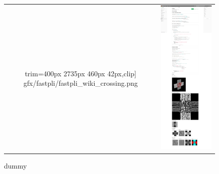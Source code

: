 \begin{figure}[!tb]
{{\begin{tabular}{c|c}
         					trim={400px 2735px 460px 42px},clip]{
         						gfx/fastpli/fastpli_wiki_crossing.png} &
         	\includegraphics[width=\textwidth,height=\textheight,keepaspectratio,
         					trim={400px 42px 460px 2465px},clip]{
         						gfx/fastpli/fastpli_wiki_crossing.png}  \\
    \end{tabular}
    }}
	\caption{dummy}
	\label{fig:fastpli_wiki_crossing}
\end{figure}
